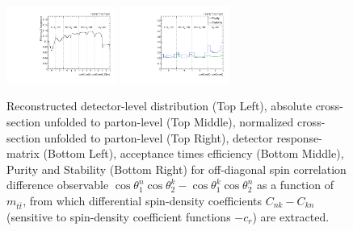 \begin{figure}[htb]
\begin{center}
 \includegraphics[width=0.32\textwidth]{fig_fullRun2UL/unfolding/combined/TotEff_c_Mnk_mttbar.pdf}
 \includegraphics[width=0.32\textwidth]{fig_fullRun2UL/unfolding/combined/PurStab_c_Mnk_mttbar.pdf} \\
\caption{Reconstructed detector-level distribution (Top Left), absolute cross-section unfolded to parton-level (Top Middle), normalized cross-section unfolded to parton-level (Top Right), detector response-matrix (Bottom Left), acceptance times efficiency (Bottom Middle), Purity and Stability (Bottom Right) for off-diagonal spin correlation difference observable $\cos\theta_{1}^{n}\cos\theta_{2}^{k}-\cos\theta_{1}^{k}\cos\theta_{2}^{n}$ as a function of $m_{t\bar{t}}$, from which differential spin-density coefficients $C_{nk}-C_{kn}$ (sensitive to spin-density coefficient functions $-c_r$) are extracted.}
\label{fig:c_Mnk_mttbar}
\end{center}
\end{figure}
\clearpage
